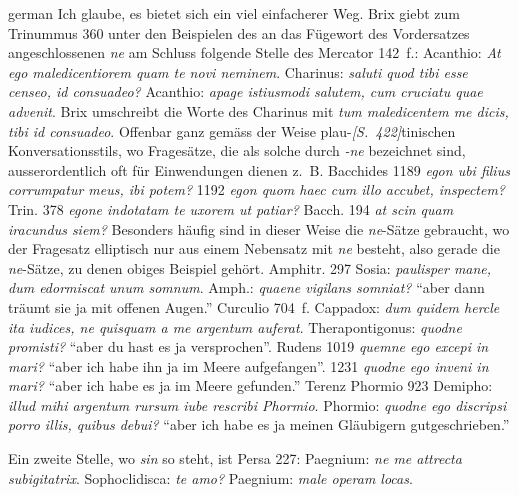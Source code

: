 \begin{otherlanguage*}{german}
Ich glaube, es bietet sich ein viel einfacherer Weg. Brix giebt zum Trinummus 360 unter den Beispielen des an das Fügewort des Vordersatzes angeschlossenen \emph{ne} am Schluss folgende Stelle des Mercator 142~f.: Acanthio: \emph{At ego maledicentiorem quam te novi neminem}. Charinus: \emph{ saluti quod tibi esse censeo, id consuadeo?} Acanthio: \emph{apage istiusmodi salutem, cum cruciatu quae advenit}. Brix umschreibt die Worte des Charinus mit \emph{tum maledicentem me dicis,  tibi id consuadeo}. Offenbar ganz gemäss der Weise plau-\hypertarget{p422}{\emph{[S.~422]}}\label{p422}tinischen Konversationsstils, wo Fragesätze, die als solche durch \emph{-ne} bezeichnet sind, ausserordentlich oft für Einwendungen dienen z.~B. Bacchides 1189 \emph{egon ubi filius corrumpatur meus, ibi potem?} 1192 \emph{egon quom haec cum illo accubet, inspectem?} Trin. 378 \emph{egone indotatam te uxorem ut patiar?} Bacch. 194 \emph{at scin quam iracundus siem?} Besonders häufig sind in dieser Weise die \emph{ne}-Sätze gebraucht, wo der Fragesatz elliptisch nur aus einem Nebensatz mit \emph{ne} besteht, also gerade die \emph{ne}-Sätze, zu denen obiges Beispiel gehört. Amphitr. 297 Sosia: \emph{paulisper mane, dum edormiscat unum somnum}. Amph.: \emph{quaene vigilans somniat?} “aber dann träumt sie ja mit offenen Augen.” Curculio 704~f. Cappadox: \emph{dum quidem hercle ita iudices, ne quisquam a me argentum auferat}. Therapontigonus: \emph{quodne promisti?} “aber du hast es ja versprochen”. Rudens 1019 \emph{quemne ego excepi in mari?} “aber ich habe ihn ja im Meere aufgefangen”. 1231 \emph{quodne ego inveni in mari?} “aber ich habe es ja im Meere gefunden.” Terenz Phormio 923 Demipho: \emph{illud mihi argentum rursum iube rescribi Phormio}. Phormio: \emph{quodne ego discripsi porro illis, quibus debui?} “aber ich habe es ja meinen Gläubigern gutgeschrieben.”

Ein zweite Stelle, wo \emph{sin} so steht, ist Persa 227: Paegnium: \emph{ne me attrecta subigitatrix}. Sophoclidisca: \emph{ te amo?} Paegnium: \emph{male operam locas}.


\end{otherlanguage*}
